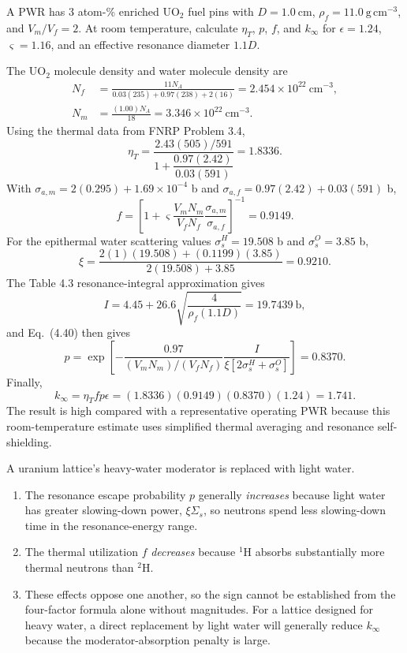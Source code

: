 

A PWR has 3 atom-\% enriched UO$_2$ fuel pins with $D=1.0~\mathrm{cm}$,
$\rho_f=11.0~\mathrm{g\,cm^{-3}}$, and $V_m/V_f=2$. At room temperature,
calculate $\eta_T$, $p$, $f$, and $k_\infty$ for $\epsilon=1.24$,
$\varsigma=1.16$, and an effective resonance diameter $1.1D$.

\begin{adaptedsolution}
The UO$_2$ molecule density and water molecule density are
\begin{align*}
N_f&=\frac{11N_A}{0.03(235)+0.97(238)+2(16)}
=2.454\times10^{22}~\mathrm{cm^{-3}},\\
N_m&=\frac{(1.00)N_A}{18}=3.346\times10^{22}~\mathrm{cm^{-3}}.
\end{align*}
Using the thermal data from FNRP Problem 3.4,
\[
\eta_T=
\frac{2.43(505)/591}
{1+\dfrac{0.97(2.42)}{0.03(591)}}
=\boxed{1.8336}.
\]
With $\sigma_{a,m}=2(0.295)+1.69\times10^{-4}$ b and
$\sigma_{a,f}=0.97(2.42)+0.03(591)$ b,
\[
f=\left[1+\varsigma\frac{V_mN_m}{V_fN_f}
\frac{\sigma_{a,m}}{\sigma_{a,f}}\right]^{-1}
=\boxed{0.9149}.
\]
For the epithermal water scattering values $\sigma_s^H=19.508$ b and
$\sigma_s^O=3.85$ b,
\[
\xi=\frac{2(1)(19.508)+(0.1199)(3.85)}{2(19.508)+3.85}
=0.9210.
\]
The Table 4.3 resonance-integral approximation gives
\[
I=4.45+26.6\sqrt{\frac{4}{\rho_f(1.1D)}}=19.7439~\mathrm{b},
\]
and Eq.~(4.40) then gives
\[
p=\exp\left[-\frac{0.97}{(V_mN_m)/(V_fN_f)}
\frac{I}{\xi[2\sigma_s^H+\sigma_s^O]}\right]
=\boxed{0.8370}.
\]
Finally,
\[
k_\infty=\eta_T f p\epsilon
=(1.8336)(0.9149)(0.8370)(1.24)
=\boxed{1.741}.
\]
The result is high compared with a representative operating PWR because this
room-temperature estimate uses simplified thermal averaging and resonance
self-shielding.
\end{adaptedsolution}

\newpage
{}

A uranium lattice's heavy-water moderator is replaced with light water.

\begin{adaptedsolution}
\begin{enumerate}
\item The resonance escape probability $p$ generally \emph{increases} because
light water has greater slowing-down power, $\xi\Sigma_s$, so neutrons spend
less slowing-down time in the resonance-energy range.
\item The thermal utilization $f$ \emph{decreases} because ${}^{1}$H absorbs
substantially more thermal neutrons than ${}^{2}$H.
\item These effects oppose one another, so the sign cannot be established
from the four-factor formula alone without magnitudes. For a lattice designed
for heavy water, a direct replacement by light water will generally reduce
$k_\infty$ because the moderator-absorption penalty is large.
\end{enumerate}
\end{adaptedsolution}

